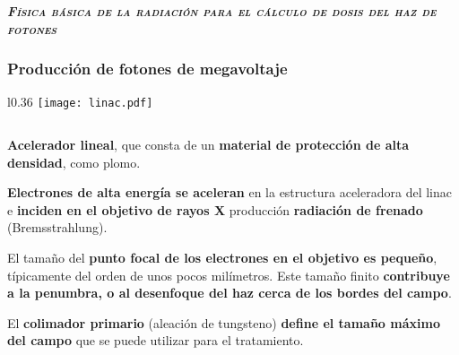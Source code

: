 \documentclass[aspectratio=169,xcolor=dvipsnames,t]{beamer}
\begin{document}


\begin{frame}[standout]
    \centering\LARGE
    \textbf{\itshape\scshape Física básica de la radiación para el cálculo de dosis del haz de fotones}
\end{frame}

\begin{frame}

    \frametitle{Producción de fotones de megavoltaje}

    \vspace{-0.7cm}

    \begin{wrapfigure}{l}{0.36\textwidth}
        \centering
        \texttt{[image: linac.pdf]}
    \end{wrapfigure}

    $\quad$

    \vspace{-0.1cm}

    \textbf{Acelerador lineal}, que consta de un \textbf{material de protección de alta densidad}, como plomo. 

    \textbf{Electrones de alta energía se aceleran} en la estructura aceleradora del linac e \textbf{inciden en el objetivo de rayos X} producción \textbf{radiación de frenado} (Bremsstrahlung).
    
    El tamaño del \textbf{punto focal de los electrones en el objetivo es pequeño}, típicamente del orden de unos pocos milímetros. Este tamaño finito \textbf{contribuye a la penumbra, o al desenfoque del haz cerca de los bordes del campo}.

    El \textbf{colimador primario} (aleación de tungsteno) \textbf{define el tamaño máximo del campo} que se puede utilizar para el tratamiento.

\end{frame}
\end{document}
